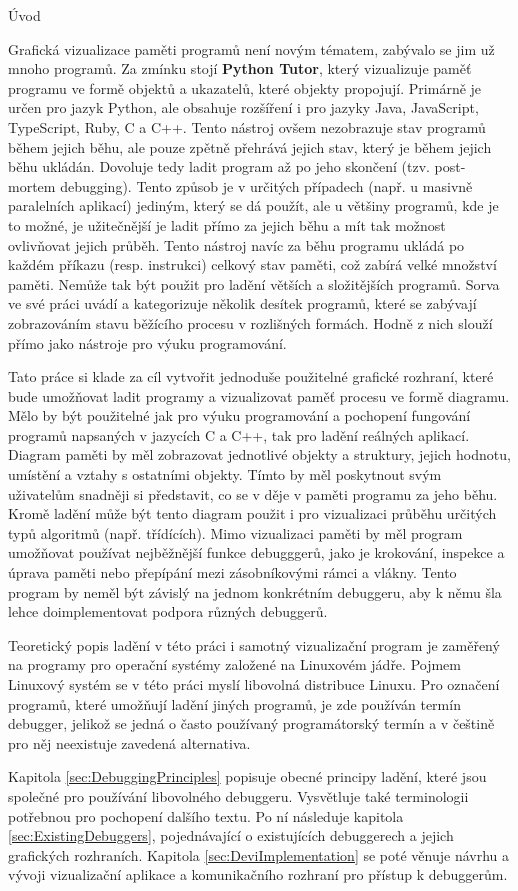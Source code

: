\documentclass[bc,male,python,dept460]{diploma}						%
\newcommand{\parspace}[1][]{
	\ifthenelse{\isempty{#1}}{\vspace{5mm}}{\vspace{#1}}
	\par
}
\begin{document}
\begin{section}{Úvod}
	\parspace Grafická vizualizace paměti programů není novým tématem, zabývalo se jim už mnoho programů. Za zmínku stojí \textbf{Python Tutor}, který vizualizuje
	paměť programu ve formě objektů a ukazatelů, které objekty propojují\cite{GuoSIGCSE2013}.
	Primárně je určen pro jazyk Python, ale obsahuje rozšíření i pro jazyky Java, JavaScript, TypeScript, Ruby, C a C++.
	Tento nástroj ovšem nezobrazuje stav programů během jejich běhu, ale pouze zpětně přehrává jejich stav, který je během jejich běhu ukládán.
	Dovoluje tedy ladit program až po jeho skončení (tzv. post-mortem debugging). Tento způsob je v určitých případech (např. u masivně
	paralelních aplikací) jediným, který se dá použít, ale u většiny programů, kde je to možné, je užitečnější je ladit přímo za jejich běhu a mít
	tak možnost ovlivňovat jejich průběh. Tento nástroj navíc za běhu programu ukládá po každém příkazu (resp. instrukci) celkový stav paměti,
	což zabírá velké množství paměti. Nemůže tak být použit pro ladění větších a složitějších programů. Sorva ve své práci uvádí a
	kategorizuje několik desítek programů, které se zabývají zobrazováním stavu běžícího procesu v rozlišných formách\cite[140]{sorva2012visual}.
	Hodně z nich slouží přímo jako nástroje pro výuku programování. 
	
	\parspace Tato práce si klade za cíl vytvořit jednoduše použitelné grafické rozhraní, které bude umožňovat ladit programy a vizualizovat paměť procesu
	ve formě diagramu. Mělo by být použitelné jak pro výuku programování a pochopení fungování programů napsaných v jazycích C a C++, tak pro ladění reálných
	aplikací. Diagram paměti by měl zobrazovat jednotlivé objekty a struktury, jejich hodnotu, umístění a vztahy s ostatními objekty.
	Tímto by měl poskytnout svým uživatelům snadněji si představit, co se v děje v paměti programu za jeho běhu.
	Kromě ladění může být tento diagram použit i pro vizualizaci průběhu určitých typů algoritmů (např. třídících). Mimo vizualizaci paměti by měl program
	umožňovat používat nejběžnější funkce debugggerů, jako je krokování, inspekce a úprava paměti nebo přepípání mezi zásobníkovými rámci a vlákny.
	Tento program by neměl být závislý na jednom konkrétním debuggeru, aby k němu šla lehce doimplementovat podpora různých debuggerů.
	
	\parspace Teoretický popis ladění v této práci i samotný vizualizační program je zaměřený na programy pro operační systémy založené na Linuxovém jádře.
	Pojmem Linuxový systém se v této práci myslí libovolná distribuce Linuxu. Pro označení programů, které umožňují ladění jiných programů,
	je zde používán termín debugger, jelikož se jedná o často používaný programátorský termín a v češtině pro něj neexistuje zavedená alternativa.

	\parspace Kapitola \ref{sec:DebuggingPrinciples} popisuje obecné principy ladění, které jsou společné pro používání libovolného debuggeru.
	Vysvětluje také terminologii potřebnou pro pochopení dalšího textu. Po ní následuje kapitola \ref{sec:ExistingDebuggers}, pojednávající o existujících
	debuggerech a jejich grafických rozhraních. Kapitola \ref{sec:DeviImplementation} se poté věnuje návrhu a vývoji vizualizační aplikace a
	komunikačního rozhraní pro přístup k debuggerům.
\end{section}
\end{document}
